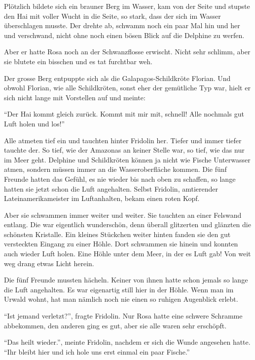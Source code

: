 Plötzlich bildete sich ein brauner Berg im Wasser, kam von der Seite und stupste den Hai mit voller Wucht in die Seite, so stark, dass der sich im Wasser überschlagen musste. Der drehte ab, schwamm noch ein paar Mal hin und her und verschwand, nicht ohne noch einen bösen Blick auf die Delphine zu werfen. 

Aber er hatte Rosa noch an der Schwanzflosse erwischt. Nicht sehr schlimm, aber sie blutete ein bisschen und es tat furchtbar weh.

Der grosse Berg entpuppte sich als die Galapagos-Schildkröte Florian. Und obwohl Florian, wie alle Schildkröten, sonst eher der gemütliche Typ war, hielt er sich nicht lange mit Vorstellen auf und meinte: 

\enquote{Der Hai kommt gleich zurück. Kommt mit mir mit, schnell! Alle nochmals gut Luft holen und los!}

Alle atmeten tief ein und tauchten hinter Fridolin her. Tiefer und immer tiefer tauchte der. So tief, wie der Amazonas an keiner Stelle war, so tief, wie das nur im Meer geht. Delphine und Schildkröten können ja nicht wie Fische Unterwasser atmen, sondern müssen immer an die Wasseroberfläche kommen. Die fünf Freunde hatten das Gefühl, es nie wieder bis nach oben zu schaffen, so lange hatten sie jetzt schon die Luft angehalten. Selbst Fridolin, amtierender Lateinamerikameister im Luftanhalten, bekam einen roten Kopf.

Aber sie schwammen immer weiter und weiter. Sie tauchten an einer Felswand entlang. Die war eigentlich wunderschön, denn überall glitzerten und glänzten die schönsten Kristalle. Ein kleines Stückchen weiter hinten fanden sie den gut versteckten Eingang zu einer Höhle. Dort schwammen sie hinein und konnten auch wieder Luft holen. Eine Höhle unter dem Meer, in der es Luft gab! Von weit weg drang etwas Licht herein.

Die fünf Freunde mussten hächeln. Keiner von ihnen hatte schon jemals so lange die Luft angehalten. Es war eigenartig still hier in der Höhle. Wenn man im Urwald wohnt, hat man nämlich noch nie einen so ruhigen Augenblick erlebt.

\enquote{Ist jemand verletzt?}, fragte Fridolin. Nur Rosa hatte eine schwere Schramme abbekommen, den anderen ging es gut, aber sie alle waren sehr erschöpft.

\enquote{Das heilt wieder.}, meinte Fridolin, nachdem er sich die Wunde angesehen hatte. \enquote{Ihr bleibt hier und ich hole uns erst einmal ein paar Fische.}

